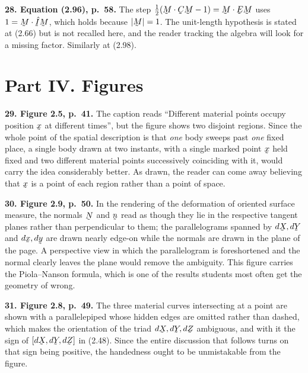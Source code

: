 \documentclass[12pt,a4paper]{article}
\DeclareRobustCommand{\vek}[1]{\underaccent{\tilde}{#1}}
\newcommand{\bx}{\vek{x}}
\newcommand{\bX}{\vek{X}}
\newcommand{\bn}{\vek{n}}
\newcommand{\bC}{\vek{C}}
\newcommand{\bE}{\vek{E}}
\newcommand{\bM}{\vek{M}}
\newcommand{\bY}{\vek{Y}}
\newcommand{\bZ}{\vek{Z}}
\newcommand{\by}{\vek{y}}
\newcommand{\I}{\vek{I}}
\newenvironment{query}[1]%
  {\par\medskip\noindent\textbf{#1}\quad}{\par\medskip}
\begin{document}
\begin{query}{28. Equation (2.96), p.~58.}
The step $\tfrac12(\bM\cdot\bC\bM-1)=\bM\cdot\bE\bM$ uses
$1=\bM\cdot\hat{\I}\bM$, which holds because $|\bM|=1$. The unit-length
hypothesis is stated at (2.66) but is not recalled here, and the reader
tracking the algebra will look for a missing factor. Similarly at (2.98).
\end{query}

\section*{Part IV. Figures}

\begin{query}{29. Figure 2.5, p.~41.}
The caption reads ``Different material points occupy position $\bx$ at
different times'', but the figure shows two disjoint regions. Since the
whole point of the spatial description is that \emph{one} body sweeps past
\emph{one} fixed place, a single body drawn at two instants, with a single
marked point $\bx$ held fixed and two different material points
successively coinciding with it, would carry the idea considerably better.
As drawn, the reader can come away believing that $\bx$ is a point of each
region rather than a point of space.
\end{query}

\begin{query}{30. Figure 2.9, p.~50.}
In the rendering of the deformation of oriented surface measure, the
normals $\vek{N}$ and $\bn$ read as though they lie in the respective
tangent planes rather than perpendicular to them; the parallelograms
spanned by $d\bX,d\bY$ and $d\bx,d\by$ are drawn nearly edge-on while the
normals are drawn in the plane of the page. A perspective view in which
the parallelogram is foreshortened and the normal clearly leaves the plane
would remove the ambiguity. This figure carries the Piola--Nanson formula,
which is one of the results students most often get the geometry of wrong.
\end{query}

\begin{query}{31. Figure 2.8, p.~49.}
The three material curves intersecting at a point are shown with a
parallelepiped whose hidden edges are omitted rather than dashed, which
makes the orientation of the triad $d\bX,d\bY,d\bZ$ ambiguous, and with it
the sign of $[d\bX,d\bY,d\bZ]$ in (2.48). Since the entire discussion that
follows turns on that sign being positive, the handedness ought to be
unmistakable from the figure.
\end{query}
\end{document}
